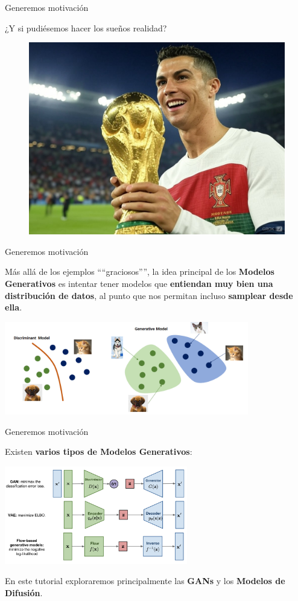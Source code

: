 \documentclass[aspectratio=169,xcolor=dvipsnames, t, spanish]{beamer}
\begin{document}
\begin{frame}{Generemos motivación}
\begin{center}
    ¿Y si pudiésemos hacer los sueños realidad?
    \pause
\end{center}
    \begin{figure}
        \centering
        \includegraphics[width=0.5\linewidth]{figures/CristanoCopaDelMundo.jpeg}
    \end{figure}
\end{frame}

\begin{frame}{Generemos motivación}
\begin{center}
    Más allá de los ejemplos ````graciosos'''', la idea principal de los \textbf{Modelos Generativos} es intentar tener modelos que \textbf{entiendan muy bien una distribución de datos}, al punto que nos permitan incluso \textbf{samplear desde ella}.
    \vspace{2mm}
    
    \includegraphics[width=0.8\textwidth]{figures/GenvsDisc.png}
\end{center}
\end{frame}

\begin{frame}{Generemos motivación}\vspace{-6mm}
\begin{center}
    Existen \textbf{varios tipos de Modelos Generativos}:
    \vspace{2mm}
    
    \includegraphics[width=0.6\textwidth]{figures/GenModels.png}
    \vspace{2mm}

    En este tutorial exploraremos principalmente las \textbf{GANs} y los \textbf{Modelos de Difusión}.
\end{center}
\end{frame}
\end{document}

